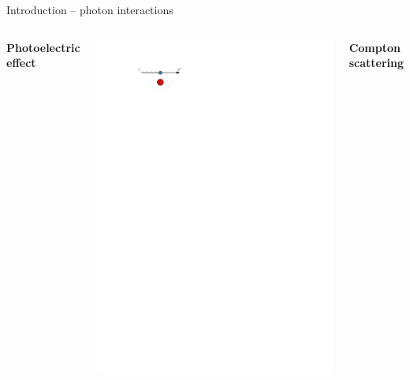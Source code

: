 \documentclass[11pt,xcolor=dvipsnames,professionalfonts]{beamer}
\begin{document}
\begin{frame}{Introduction -- photon interactions}
	\pause
	\begin{columns}
			\centering
			\textbf{Photoelectric effect}
			
			\vspace{1.17cm}
			
			\includegraphics[width=1.\textwidth]{./figures/photoeffect_intro.pdf}
		
		\pause
		
			\centering
			\textbf{Compton scattering}
			
			\vspace{.5cm}
			

\end{columns}
\end{frame}
\end{document}
